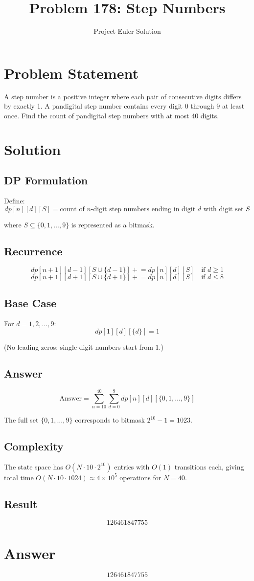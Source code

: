 \documentclass[12pt]{article}
\title{Problem 178: Step Numbers}
\author{Project Euler Solution}
\date{}
\begin{document}
\maketitle

\section{Problem Statement}
A step number is a positive integer where each pair of consecutive digits differs by exactly 1. A pandigital step number contains every digit 0 through 9 at least once. Find the count of pandigital step numbers with at most 40 digits.

\section{Solution}

\subsection{DP Formulation}

Define:
\[
dp[n][d][S] = \text{count of $n$-digit step numbers ending in digit $d$ with digit set $S$}
\]

where $S \subseteq \{0,1,\ldots,9\}$ is represented as a bitmask.

\subsection{Recurrence}

\[
dp[n+1][d-1][S \cup \{d-1\}] \mathrel{+}= dp[n][d][S] \quad \text{if } d \geq 1
\]
\[
dp[n+1][d+1][S \cup \{d+1\}] \mathrel{+}= dp[n][d][S] \quad \text{if } d \leq 8
\]

\subsection{Base Case}

For $d = 1, 2, \ldots, 9$:
\[
dp[1][d][\{d\}] = 1
\]

(No leading zeros: single-digit numbers start from 1.)

\subsection{Answer}

\[
\text{Answer} = \sum_{n=10}^{40} \sum_{d=0}^{9} dp[n][d][\{0,1,\ldots,9\}]
\]

The full set $\{0,1,\ldots,9\}$ corresponds to bitmask $2^{10}-1 = 1023$.

\subsection{Complexity}

The state space has $O(N \cdot 10 \cdot 2^{10})$ entries with $O(1)$ transitions each, giving total time $O(N \cdot 10 \cdot 1024) \approx 4 \times 10^5$ operations for $N=40$.

\subsection{Result}

\[
\boxed{126461847755}
\]

\section{Answer}

\[
\boxed{126461847755}
\]
\end{document}
